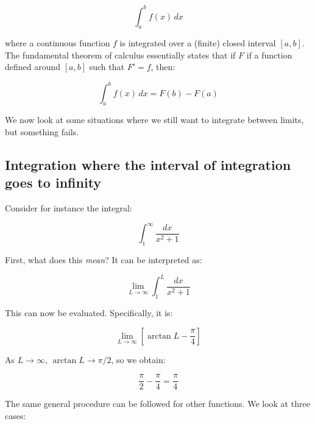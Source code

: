 \documentclass[10pt]{amsart}
\begin{document}
$$\int_a^b f(x) \, dx$$

where a continuous function $f$ is integrated over a (finite) closed
interval $[a,b]$. The fundamental theorem of calculus essentially
states that if $F$ if a function defined around $[a,b]$ such that $F'
= f$, then:

$$\int_a^b f(x) \, dx = F(b) - F(a)$$

We now look at some situations where we still want to integrate
between limits, but something fails.

\subsection{Integration where the interval of integration goes to infinity}

Consider for instance the integral:

$$\int_1^\infty \frac{dx}{x^2 + 1}$$

First, what does this {\em mean}? It can be interpreted as:

$$\lim_{L \to \infty} \int_1^L \frac{dx}{x^2 + 1}$$

This can now be evaluated. Specifically, it is:

$$\lim_{L \to \infty} [\arctan L - \frac{\pi}{4}]$$

As $L \to \infty$, $\arctan L \to \pi/2$, so we obtain:

$$\frac{\pi}{2} - \frac{\pi}{4} = \frac{\pi}{4}$$

The same general procedure can be followed for other functions. We
look at three cases:
\end{document}
